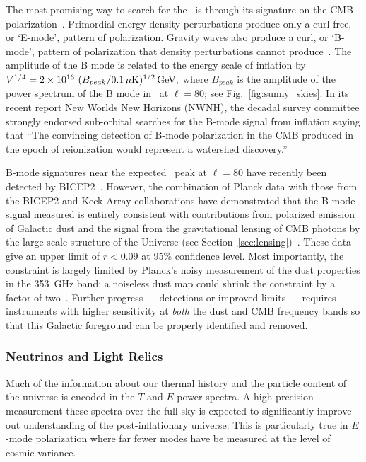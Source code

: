 The most promising way to search for the \igb\ is through its signature on the CMB polarization~\cite{kamionkowski97b,seljak97}.  
Primordial energy density perturbations produce only a curl-free, or `E-mode', pattern of polarization.
Gravity waves also produce a curl, or `B-mode', pattern of polarization that density perturbations cannot
produce~\cite{kamionkowski97a,zaldarriaga97}.  The amplitude of the B mode is related to the energy scale
of inflation by $V^{1/4}=2\times10^{16} \ ( B_{peak} / 0.1\,\mu{\rm
K})^{1/2} \,{\rm GeV},$ where $B_{peak}$ is the amplitude of the power spectrum of the B mode in \microk\ at $\ell=80$;
see Fig.~\ref{fig:sunny_skies}. In its recent report New Worlds New Horizons (NWNH), the decadal survey 
committee strongly endorsed sub-orbital searches for the B-mode signal from 
inflation saying that ``The convincing detection of B-mode polarization in the CMB produced in the 
epoch of reionization would represent a watershed discovery.''~\cite{blandford2010}

B-mode signatures near the expected \igb\ peak at $\ell=80$ have recently been detected by BICEP2~\cite{bicep2Bmode}. 
However, the combination of Planck data with those from the BICEP2 and Keck Array collaborations have demonstrated 
that the B-mode signal measured is entirely consistent with contributions from polarized emission of Galactic dust and the 
signal from the gravitational lensing of CMB photons by the large scale structure of the Universe (see 
Section~\ref{sec:lensing})~\cite{bkp2015,planck2014-XXX,2016PhRvL.116c1302B}. 
These data give an upper limit of $r<0.09$ at 95\% confidence level.
Most importantly, the constraint is largely limited by Planck's noisy measurement of the dust properties in the 353~GHz band; 
a noiseless dust map could shrink the constraint by a factor of two~\cite{bkp2015}. 
Further progress --- detections or improved limits --- requires instruments 
with higher sensitivity at {\it both} the dust and CMB frequency bands so that this Galactic foreground can be properly identified 
and removed. 

\vspace{-0.22in}

\subsubsection{Neutrinos and Light Relics}

\vspace{-0.05in}

Much of the information about our thermal history and the particle content of the universe is encoded in the $T$ and $E$ power spectra.  
A high-precision measurement these spectra over the full sky is expected to significantly improve out understanding of the post-inflationary 
universe.  This is particularly true in $E$-mode polarization where far fewer modes have be measured at the level of cosmic variance.   

